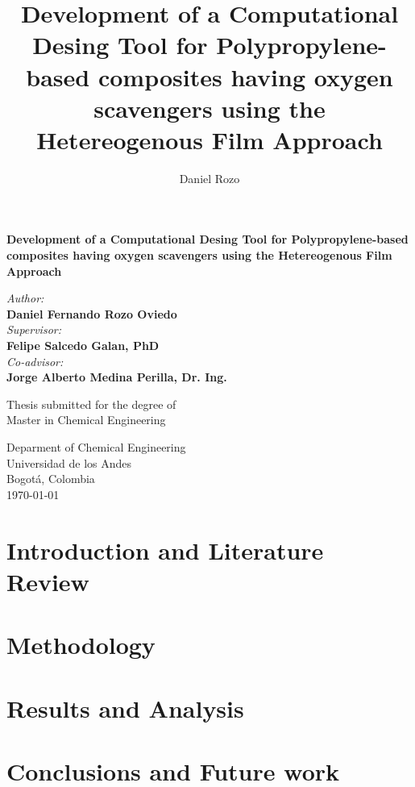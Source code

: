 \documentclass[twoside,11pt]{report}
\title{Development of a Computational Desing Tool for Polypropylene-based composites having oxygen scavengers using the Hetereogenous Film Approach}
\author{Daniel Rozo}
\date{\Today}
\begin{document}
\begin{titlepage}
\begin{center}
\BgThispage
        \huge
        \textbf{Development of a Computational Desing Tool for Polypropylene-based composites having oxygen scavengers using the Hetereogenous Film Approach}
        
        \vspace{1cm}
        \LARGE

        \vspace{1cm}
        \textit{Author:}\\
        \textbf{Daniel Fernando Rozo Oviedo}\\
        \vspace{1.5cm}
        \textit{Supervisor:}\\
        \textbf{Felipe Salcedo Galan, PhD}\\
        \textit{Co-advisor:}\\
        \textbf{Jorge Alberto Medina Perilla, Dr. Ing.}
        \vfill
 
        Thesis submitted for the degree of\\ Master in Chemical Engineering
        
 
        \vspace{0.5cm}
 
        
 
        \Large
        Deparment of Chemical Engineering\\
        Universidad de los Andes\\
        Bogotá, Colombia\\
        \today
 
    \end{center}
\afterpage{\null\newpage}
\end{titlepage}

\tableofcontents
\vspace{\fill}
\chapter{Introduction and Literature Review}
\pagestyle{fancy}

\pagebreak
\chapter{Methodology}

\chapter{Results and Analysis}

\chapter{Conclusions and Future work}

\end{document}
